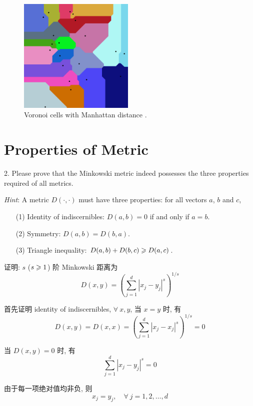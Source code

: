 \documentclass{article}
\begin{document}
\begin{figure}[ht]
	\centering
	\includegraphics[width=5.5cm]{Manhattan_Voronoi_Diagram.png}
	\caption{Voronoi cells with Manhattan distance \cite{ManhattanVoronoi}.}
	\label{fig:l1}
\end{figure}

\section*{Properties of Metric}

2. Please prove that the Minkowski metric indeed possesses the three properties required of all metrics.

\emph{Hint}: A metric $D(\cdot,\cdot)$ must have three properties: for all vectors $a$, $b$ and $c$,
\begin{enumerate}
  \item[(1)] Identity of indiscernibles: $D(a, b) = 0$ if and only if $a = b$.
  \item[(2)] Symmetry: $D(a, b) = D(b, a)$.
  \item[(3)] Triangle inequality: $D(a, b) + D(b, c) \geqslant D(a, c)$.
\end{enumerate}

证明: $s$ ($s\geqslant1$) 阶 Minkowski 距离为
\begin{equation}
  D(x,y)=\left(\sum_{j=1}^d|x_j-y_j|^s\right)^{1/s}
\end{equation}

首先证明 identity of indiscernibles, $\forall~x,y$, 当 $x=y$ 时, 有
\begin{equation}
  D(x,y)=D(x,x)=\left(\sum_{j=1}^d|x_j-x_j|^s\right)^{1/s}=0
\end{equation}

当 $D(x,y)=0$ 时, 有
\begin{equation}
  \sum_{j=1}^d|x_j-y_j|^s=0
\end{equation}

由于每一项绝对值均非负, 则
\begin{equation}
  x_j=y_j,\quad\forall~j=1,2,\dots,d
\end{equation}
\end{document}
